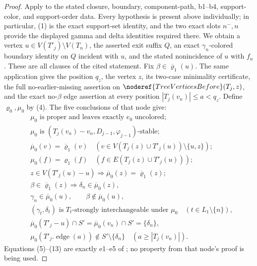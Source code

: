 \begin{proof}
Apply  to the stated closure, boundary,
component-path, b1--b4, support-color, and support-order data.  Every
hypothesis is present above individually; in particular, (1) is the exact
support-set identity, and the two exact slots \(n^-,n\) provide the
displayed gamma and delta identities required there.  We obtain a vertex
\(u\in V(T'_j)\setminus V(T_n)\), the asserted exit suffix \(Q\), an exact
\(\gamma_n\)-colored boundary identity on \(Q\) incident with \(u\), and
the stated nonincidence of \(u\) with \(f_n\).  These are all clauses of
the cited statement.  Fix
\(\beta\in\overline{\varrho}_1(u)\).  The same application gives the
position \(q_z\), the vertex \(z\), its two-case minimality certificate,
the full no-earlier-missing assertion on
\(\noderef{TreeVerticesBefore}(T_j,z)\), and the exact no-\(\beta\) edge
assertion at every position \(|T_j(v_n)|\le a<q_z\).  Define
\(\varrho_0,\mu_0\) by (4).
The five conclusions of that node give:
\begin{align}
 &\mu_0\text{ is proper and leaves exactly }e_0\text{ uncolored};
                                                                    \tag{5}\\
 &\mu_0\text{ is }(T_j(v_n)-v_n,D_{j-1},\varphi_{j-1})
    \text{-stable};                                                 \tag{6}\\
 &\overline\mu_0(v)=\overline{\varrho}_1(v)
   \quad(v\in V(T_j(z)\cup T'_j(u))\setminus\{u,z\});               \tag{7}\\
 &\mu_0(f)=\varrho_1(f)
   \quad(f\in E(T_j(z)\cup T'_j(u)));                               \tag{8}\\
 &z\in V(T'_j(u)-u)\Longrightarrow
   \overline\mu_0(z)=\overline{\varrho}_1(z);                      \tag{8a}\\
 &\beta\in\overline{\varrho}_1(z)
      \Longrightarrow\delta_n\in\overline\mu_0(z),                 \tag{9}\\
 &\gamma_n\in\overline\mu_0(u),\qquad
   \beta\notin\overline\mu_0(u),                                   \tag{10}\\
 &(\gamma_t,\delta_t)\text{ is }T_t\text{-strongly interchangeable
   under }\mu_0\quad(t\in L_1\setminus\{n\}),                       \tag{11}\\
 &\overline\mu_0(T'_j-u)\cap S'
    =\overline\mu_0(v_n)\cap S'=\{\delta_n\},                       \tag{12}\\
 &\mu_0(T'_j.\operatorname{edge}(a))\notin S'\setminus\{\delta_n\}
   \quad(a\ge |T_j(v_n)|).                                         \tag{13}
\end{align}
Equations (5)--(13) are exactly e1--e5 of
; no property from that node's proof is
being used.


\end{proof}
